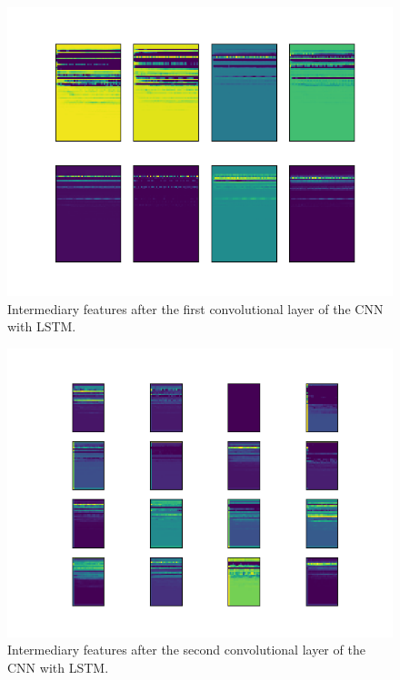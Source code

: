 \documentclass{article}
\begin{document}
\begin{figure}
\includegraphics[scale=0.5]{figs/latent_space_layer1.png}
\caption{Intermediary features after the first convolutional layer of the CNN with LSTM. \label{latent1}}
\end{figure}

\begin{figure}
\includegraphics[scale=0.5]{figs/latent_space_layer2.png}
\caption{Intermediary features after the second convolutional layer of the CNN with LSTM. \label{latent2}}
\end{figure}
\end{document}
